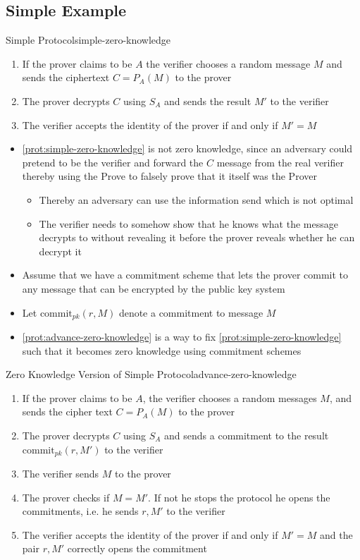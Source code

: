 \subsection{Simple Example}
\begin{protocol}{Simple Protocol}{simple-zero-knowledge}
  \begin{enumerate}
  	\item If the prover claims to be $A$ the verifier chooses a random message $M$ and sends the ciphertext $C = P_A(M)$ to the prover
  	\item The prover decrypts $C$ using $S_A$ and sends the result $M'$ to the verifier
  	\item The verifier accepts the identity of the prover if and only if $M' = M$
  \end{enumerate}
\end{protocol}
\begin{itemize}
  \item \autoref{prot:simple-zero-knowledge} is not zero knowledge, since an adversary could pretend to be the verifier and forward the $C$ message from the real verifier thereby using the Prove to falsely prove that it itself was the Prover
  \begin{itemize}
  	\item Thereby an adversary can use the information send which is not optimal
    \item The verifier needs to somehow show that he knows what the message decrypts to without revealing it before the prover reveals whether he can decrypt it
  \end{itemize}

  \item Assume that we have a commitment scheme that lets the prover commit to any message that can be encrypted by the public key system
  \item Let $\text{commit}_{pk}(r,M)$ denote a commitment to message $M$
  \item \autoref{prot:advance-zero-knowledge} is a way to fix \autoref{prot:simple-zero-knowledge} such that it becomes zero knowledge using commitment schemes

\end{itemize}
\begin{protocol}{Zero Knowledge Version of Simple Protocol}{advance-zero-knowledge}
  \begin{enumerate}
  	\item If the prover claims to be $A$, the verifier chooses a random messages $M$, and sends the cipher text $C=P_A(M)$ to the prover
  	\item The prover decrypts $C$ using $S_A$ and sends a commitment to the result $\text{commit}_{pk}(r,M')$ to the verifier
  	\item The verifier sends $M$ to the prover
  	\item The prover checks if $M = M'$. If not he stops the protocol he opens the commitments, i.e. he sends $r,M'$ to the verifier
  	\item The verifier accepts the identity of the prover if and only if $M' = M$ and the pair $r,M'$ correctly opens the commitment 
  \end{enumerate}
\end{protocol}

